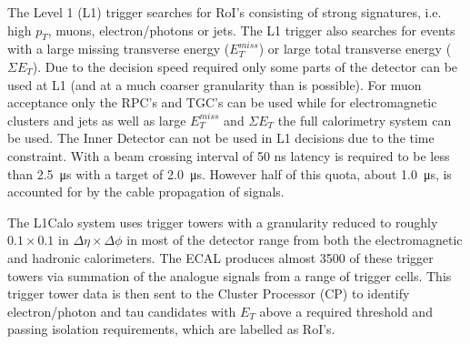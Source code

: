	The Level 1 (L1) trigger searches for RoI's consisting of strong signatures, i.e. high $p_{T}$, muons, electron/photons or jets. The L1 trigger also searches for events with a large missing transverse energy ($E^{miss}_{T}$) or large total transverse energy ($\Sigma E_{T}$). Due to the decision speed required only some parts of the detector can be used at L1 (and at a much coarser granularity than is possible). For muon acceptance only the RPC's and TGC's can be used while for electromagnetic clusters and jets as well as large $E^{miss}_{T}$ and $\Sigma E_{T}$ the full calorimetry system can be used. The Inner Detector can not be used in L1 decisions due to the time constraint. With a beam crossing interval of 50 ns latency is required to be less than \SI{2.5}{\us} with a target of \SI{2.0}{\us}. However half of this quota, about \SI{1.0}{\us}, is accounted for by the cable propagation of signals.


	The L1Calo system uses trigger towers with a granularity reduced to roughly $0.1 \times 0.1$ in $\Delta\eta \times \Delta\phi$ in most of the detector range from both the electromagnetic and hadronic calorimeters. The ECAL produces almost 3500 of these trigger towers via summation of the analogue signals from a range of trigger cells. This trigger tower data is then sent to the Cluster Processor (CP) to identify electron/photon and tau candidates with $E_{T}$ above a required threshold and passing isolation requirements, which are labelled as RoI's.


